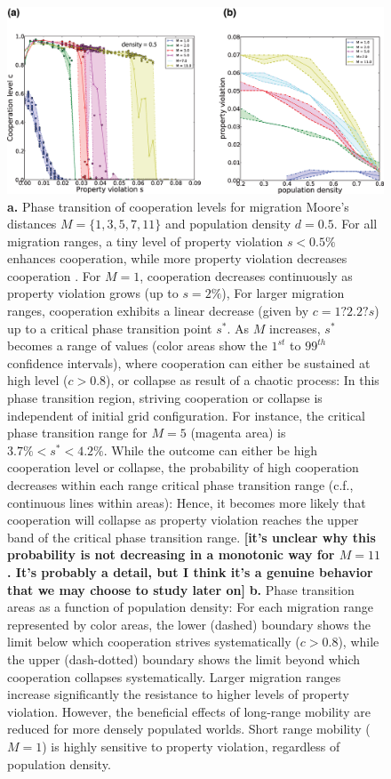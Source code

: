 \begin{figure}[h]
\begin{center}
\centerline{\includegraphics[width=16cm]{../figures2/phase_transition_d05.eps}}
\caption{{\bf a.} Phase transition of cooperation levels for migration Moore's distances $M = \{1,3,5,7,11\}$ and population density $d=0.5$. For all migration ranges, a tiny level of property violation $s < 0.5\%$ enhances cooperation, while more property violation decreases cooperation . For $M=1$, cooperation decreases continuously as property violation grows (up to  $s = 2\%$), For larger migration ranges, cooperation exhibits a linear decrease (given by $c = 1 ? 2.2 ? s$) up to a critical phase transition point $s^*$. As $M$ increases, $s^{*}$ becomes a range of values (color areas show the $1^{st}$ to $99^{th}$ confidence intervals), where cooperation can either be sustained at high level ($c > 0.8$), or collapse as result of a chaotic process: In this phase transition region, striving cooperation or collapse is independent of initial grid configuration. For instance, the critical phase transition range for $M=5$ (magenta area) is $ 3.7\% < s^{*} < 4.2\%$. While the outcome can either be high cooperation level or collapse, the probability of high cooperation decreases within each range critical phase transition range (c.f., continuous lines within areas): Hence, it becomes more likely that cooperation will collapse as property violation reaches the upper band of the critical phase transition range. {\bf [it's unclear why this probability is not decreasing in a monotonic way for $M=11$. It's probably a detail, but I think it's a genuine behavior that we may choose to study later on]} {\bf b.} Phase transition areas as a function of population density: For each migration range represented by color areas, the lower (dashed) boundary shows the limit below which cooperation strives systematically ($c > 0.8$), while the upper (dash-dotted) boundary shows the limit beyond which cooperation collapses systematically.  Larger migration ranges increase significantly the resistance to higher levels of property violation. However, the beneficial effects of long-range mobility are reduced for more densely populated worlds. Short range mobility ($M=1$) is highly sensitive to property violation, regardless of population density.}
\label{fig:phase_transition}
\end{center}
\end{figure}



